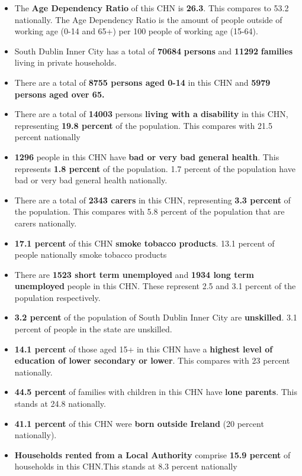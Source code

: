 \documentclass{article}
\begin{document}
\begin{itemize}

\item The \textbf{Age Dependency Ratio} of this CHN is  \textbf{26.3}. This compares to 53.2 nationally. The Age Dependency Ratio is the amount of people outside of working age (0-14 and 65+) per 100 people of working age (15-64). 

\item South Dublin Inner City has a total of \textbf{\num{70684}} \textbf{persons} and  \textbf{\num{11292}} \textbf{families} living in private households.

\item There are a total of \textbf{\num{8755} persons aged 0-14} in this CHN and \textbf{\num{5979} persons aged over 65.} 

\item There are a total of \textbf{\num{14003}} persons \textbf{living with a disability} in this CHN, representing \textbf{19.8 percent} of the population. This compares with  21.5 percent nationally

\item \textbf{\num{1296}} people in this CHN have \textbf{bad or very bad general health}. This represents \textbf{1.8 percent} of the population. 1.7 percent of the population have bad or very bad general health nationally. 

\item There are a total of \textbf{\num{2343} carers} in this CHN, representing \textbf{3.3 percent} of the population. This compares with 5.8 percent of the population that are carers nationally. 

\item \textbf{17.1 percent} of this CHN \textbf{smoke tobacco products}. 13.1 percent of people nationally smoke tobacco products

\item There are \textbf{\num{1523} short term unemployed} and \textbf{\num{1934} long term unemployed} people in this CHN. These represent 2.5 and 3.1 percent of the population respectively.

\item  \textbf{3.2 percent} of the population of South Dublin Inner City are \textbf{unskilled}. 3.1 percent of people in the state are unskilled.

\item \textbf{14.1 percent} of those aged 15+ in this CHN have a \textbf{highest level of education of lower secondary or lower}. This compares with 23 percent nationally. 

\item \textbf{44.5 percent} of families with children in this CHN have \textbf{lone parents}. This stands at 24.8 nationally.

\item \textbf{41.1 percent} of this CHN were \textbf{born outside Ireland} (20 percent nationally).

\item \textbf{Households rented from a Local Authority} comprise \textbf{15.9 percent} of households in this CHN.This stands at 8.3 percent nationally

\end{itemize}
\end{document}
